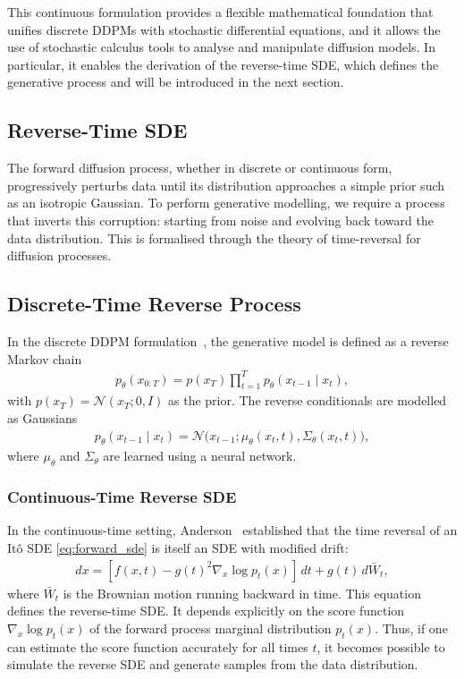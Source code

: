 \documentclass[a4paper,12pt]{article}
\begin{document}
This continuous formulation provides a flexible mathematical foundation that unifies discrete DDPMs with stochastic differential equations, and it allows the use of stochastic calculus tools to analyse and manipulate diffusion models. 
In particular, it enables the derivation of the reverse-time SDE, which defines the generative process and will be introduced in the next section.

\subsection{Reverse-Time SDE}
The forward diffusion process, whether in discrete or continuous form, progressively perturbs data until its distribution approaches a simple prior such as an isotropic Gaussian. 
To perform generative modelling, we require a process that inverts this corruption: starting from noise and evolving back toward the data distribution. 
This is formalised through the theory of time-reversal for diffusion processes.
\subsection{Discrete-Time Reverse Process}
In the discrete DDPM formulation~\cite{hoDenoisingDiffusionProbabilistic2020}, the generative model is defined as a reverse Markov chain
\begin{align*}
    p_\theta\left(x_{0:T}\right) = p(x_T) \prod_{t=1}^{T} p_\theta(x_{t-1} \mid x_t),
\end{align*}
with $p(x_T) = \mathcal{N}(x_T;0,I)$ as the prior. 
The reverse conditionals are modelled as Gaussians
\begin{align*}
    p_\theta\left(x_{t-1} \mid x_t\right) = \mathcal{N}\!\big(x_{t-1}; \mu_\theta(x_t,t), \Sigma_\theta(x_t,t)\big),
\end{align*}
where $\mu_\theta$ and $\Sigma_\theta$ are learned using a neural network. 

\subsubsection{Continuous-Time Reverse SDE}
In the continuous-time setting, Anderson~\cite{andersonReversetimeDiffusionEquation1982} established that the time reversal of an It\^{o} SDE \eqref{eq:forward_sde}
is itself an SDE with modified drift:
\begin{align}\label{eq:reverse_sde}
    dx = \left[f(x,t) - g(t)^2 \nabla_x \log p_t(x)\right]\,dt + g(t)\,d\bar W_t,
\end{align}
where \(\bar W_t\) is the Brownian motion running backward in time. This equation defines the reverse-time SDE. It depends explicitly on the score function \(\nabla_x \log p_t(x)\) of the forward process marginal distribution \(p_t(x)\). Thus, if one can estimate the score function accurately for all times \(t\), it becomes possible to simulate the reverse SDE and generate samples from the data distribution.
\end{document}
